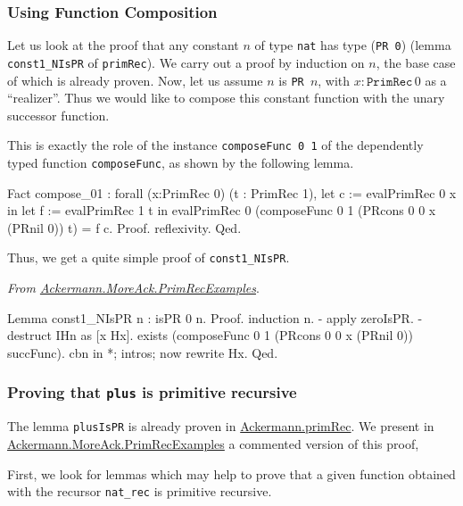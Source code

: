 \subsubsection{Using Function Composition}

Let us look at the proof that any constant $n$ of type \texttt{nat} has type (\texttt{PR 0})
(lemma  \texttt{const1\_NIsPR} of \texttt{primRec}). We carry out a proof by induction on $n$, the base case of which is already proven.
Now, let us assume $n$ is \texttt{PR $n$}, with $x:\texttt{PrimRec}\,0$ as a ``realizer''.
Thus we would like to compose this constant function with the unary successor function.

This is exactly the role of the instance \texttt{composeFunc 0 1} of the dependently typed
function \texttt{composeFunc}, as shown by the following lemma.

\begin{Coqsrc}
Fact compose_01 :
    forall (x:PrimRec 0) (t : PrimRec 1),
    let c := evalPrimRec 0 x in
    let f := evalPrimRec 1 t in
    evalPrimRec 0 (composeFunc 0 1
                               (PRcons 0 0 x (PRnil 0))
                               t)  =
     f c.
Proof. reflexivity. Qed.
\end{Coqsrc}

Thus, we get a quite simple proof of \texttt{const1\_NIsPR}.


\vspace{4pt}
\noindent
\emph{From \href{../theories/html/hydras.Ackermann.MoreAck.PrimRecExamples.html}{Ackermann.MoreAck.PrimRecExamples}}.
\begin{Coqsrc}
Lemma  const1_NIsPR n : isPR 0 n. 
Proof.
  induction n.
  - apply zeroIsPR.
  - destruct IHn as [x Hx].
   exists (composeFunc 0 1 (PRcons 0 0 x (PRnil 0)) succFunc). 
   cbn in *; intros; now rewrite Hx.
Qed.
\end{Coqsrc}


\subsubsection{Proving that \texttt{plus} is primitive recursive}

The lemma \texttt{plusIsPR} is already proven in \href{../theories/html/hydras.Ackermann.primRec.html}{Ackermann.primRec}. We present in 
\href{../theories/html/hydras.Ackermann.MoreAck.PrimRecExamples.html}{Ackermann.MoreAck.PrimRecExamples}
a commented version of this proof, 

First, we look for lemmas which may help to prove that a given function obtained with the recursor \texttt{nat\_rec} is primitive recursive.

